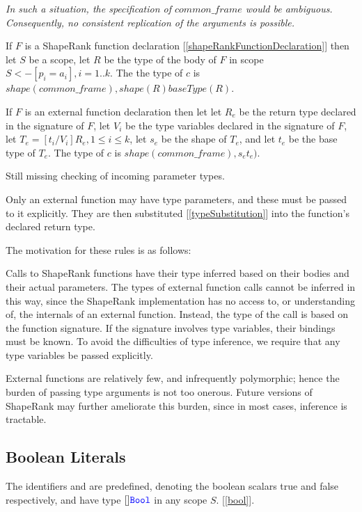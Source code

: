\documentclass{article}
\begin{document}
{\em In such a situation, the specification of $common\_frame$ would be ambiguous. Consequently, no consistent replication of the arguments is possible.}

If $F$ is a ShapeRank function declaration [\ref{shapeRankFunctionDeclaration}] then
let $S$ be a scope, let $R$ be the type of the body of $F$ in scope $S <- [p_i = a_i], i = 1..k$. The the type of $c$ is
$shape(common\_frame), shape(R) baseType(R)$.


If $F$ is an external function declaration then let let $R_e$ be the return type declared in the signature of $F$,  let $V_i$ be the type variables declared in the signature of $F$, let 
$T_e = [t_i/V_i]R_e, 1 \le i \le k$, let $s_e$ be the shape of $T_e$, and let $t_e$ be the base type of $T_e$.
The type of $c$ is
$shape(common\_frame), s_e t_e)$.

{\em 

Still missing checking of incoming parameter types.

Only an external function may have type parameters, and these must be passed to it explicitly. They are then substituted [\ref{typeSubstitution}] into the function's declared return type.

The motivation for these rules is as follows:

Calls to ShapeRank functions have their type inferred based on their bodies and their actual parameters. The types of external function calls  cannot be inferred in this way,
since the ShapeRank implementation has no access to, or understanding of, the internals of an external function. Instead, the type of the call is based on the function signature. 
If the signature involves type variables, their bindings must be known.  To avoid the difficulties of type inference, we require that any type variables be passed explicitly.

External functions are relatively few, and infrequently polymorphic; hence the burden of passing type arguments is not too onerous. Future versions of ShapeRank may 
further ameliorate this burden, since  in most cases, inference is tractable.
}


\subsection{Boolean Literals}
\label{booleanLiterals}

The identifiers \TRUE{} and \FALSE{} are predefined,  denoting the boolean scalars true and false respectively, and have type $[]\texttt{\color{blue} Bool}{}$ in any scope $S$. [\ref{bool}].
\end{document}
